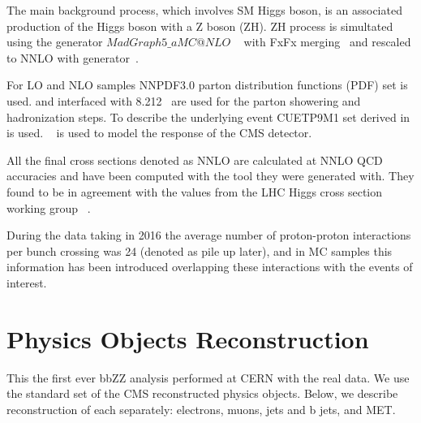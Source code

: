 The main background
       process, which involves SM Higgs boson, is an associated
       production of the Higgs boson with a Z boson (ZH).  ZH process
       is simultated using the generator
$MadGraph5\_aMC@NLO$
~\cite{cite_aMC@NLO} with FxFx
merging~\cite{Frederix:2012ps} and
rescaled to NNLO with
{\MCFM} generator~\cite{Campbell:2010ff}.


For LO and NLO samples NNPDF3.0 parton distribution functions (PDF)
set is used. {\POWHEG} and {\MADGRAPH} interfaced with
{\PYTHIA}8.212~\cite{Sjostrand:2007gs} are used for the parton
showering and hadronization steps. To describe the underlying event
CUETP9M1 set derived in \cite{Khachatryan:2015pea} is
used. \GEANTfour~\cite{GEANT4} is used to model the response of the
CMS detector.

All the final cross sections denoted as NNLO are calculated at NNLO QCD accuracies and have been computed with the tool they were generated with. They found to be in agreement with the values from the LHC Higgs cross section working group ~\cite{LHCHXSWG, xsecZH, xsecTT, xsecST, xsecVV}.

During the data taking in 2016 the average number of proton-proton interactions per bunch crossing was 24 (denoted as pile up later), and in MC samples this information has been introduced overlapping these interactions with the events of interest.



\section{Physics Objects Reconstruction}
\label{sec:objects}


This the first ever bbZZ analysis performed at CERN with the real data. We use the standard set of the CMS
reconstructed physics objects. Below, we describe reconstruction of
each separately: electrons, muons, jets and b jets, and MET.



